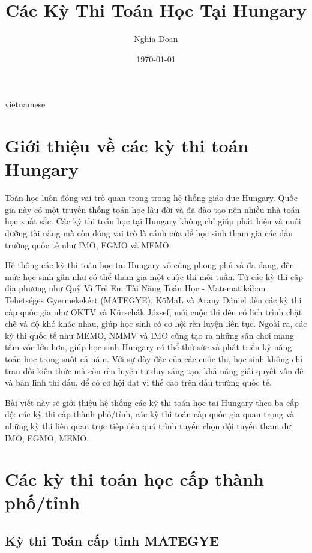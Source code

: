 \documentclass{article}
\title{Các Kỳ Thi Toán Học Tại Hungary}
\author{Nghia Doan}
\date{\today}
\begin{document}
\begin{otherlanguage*}{vietnamese}

\maketitle

\section{Giới thiệu về các kỳ thi toán Hungary}

Toán học luôn đóng vai trò quan trọng trong hệ thống giáo dục Hungary. Quốc gia này có một truyền thống toán học lâu đời và đã đào tạo nên nhiều nhà toán học xuất sắc.
Các kỳ thi toán học tại Hungary không chỉ giúp phát hiện và nuôi dưỡng tài năng mà còn đóng vai trò là cánh cửa để học sinh tham gia các đấu trường quốc tế như IMO, EGMO và MEMO.

Hệ thống các kỳ thi toán học tại Hungary vô cùng phong phú và đa dạng, đến mức học sinh gần như có thể tham gia một cuộc thi mỗi tuần.
Từ các kỳ thi cấp địa phương như Quỹ Vì Trẻ Em Tài Năng Toán Học - Matematikában Tehetséges Gyermekekért (MATEGYE), KöMaL và Arany Dániel đến các kỳ thi cấp quốc gia như OKTV và Kürschák József, mỗi cuộc thi đều có lịch trình chặt chẽ và độ khó khác nhau,
giúp học sinh có cơ hội rèn luyện liên tục. Ngoài ra, các kỳ thi quốc tế như MEMO, NMMV và IMO cũng tạo ra những sân chơi mang tầm vóc lớn hơn,
giúp học sinh Hungary có thể thử sức và phát triển kỹ năng toán học trong suốt cả năm.
Với sự dày đặc của các cuộc thi, học sinh không chỉ trau dồi kiến thức mà còn rèn luyện tư duy sáng tạo, khả năng giải quyết vấn đề và bản lĩnh thi đấu,
để có cơ hội đạt vị thế cao trên đấu trường quốc tế.

Bài viết này sẽ giới thiệu hệ thống các kỳ thi toán học tại Hungary theo ba cấp độ: các kỳ thi cấp thành phố/tỉnh, các kỳ thi toán cấp quốc gia quan trọng
và những kỳ thi liên quan trực tiếp đến quá trình tuyển chọn đội tuyển tham dự IMO, EGMO, MEMO.

\newpage

\section{Các kỳ thi toán học cấp thành phố/tỉnh}

\subsection{Kỳ thi Toán cấp tỉnh MATEGYE}


\end{otherlanguage*}
\end{document}
